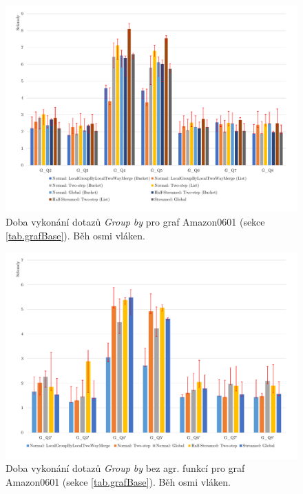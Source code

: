 \begin{figure}[!htp]
\includegraphics[width=\linewidth]{../img/amazonGroupByPar.pdf}\centering
\caption{Doba vykonání dotazů \textit{Group by} pro graf Amazon0601 (sekce \ref{tab.grafBase}). Běh osmi vláken.}
\label{figure.amazonGroupByPar}
\end{figure}
\begin{figure}[!htp]
\includegraphics[width=\linewidth]{../img/amazonGroupByParNoAgg.pdf}\centering
\caption{Doba vykonání dotazů \textit{Group by} bez agr. funkcí pro graf Amazon0601 (sekce \ref{tab.grafBase}). Běh osmi vláken.}
\label{figure.amazonGroupByParNoAgg}
\end{figure}

